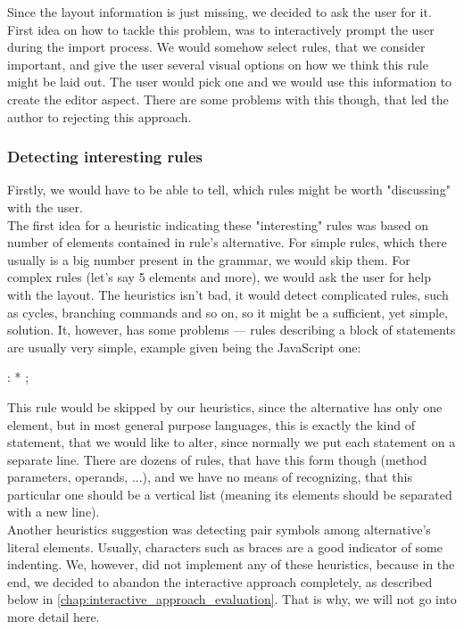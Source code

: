 Since the layout information is just missing, we decided to ask the user for it.
First idea on how to tackle this problem, was to interactively prompt the user during the import process.
We would somehow select rules, that we consider important, and give the user several visual options on how we think this rule might be laid out.
The user would pick one and we would use this information to create the editor aspect.
There are some problems with this though, that led the author to rejecting this approach.

\subsubsection{Detecting interesting rules}

Firstly, we would have to be able to tell, which rules might be worth "discussing" with the user.
\\

The first idea for a heuristic indicating these "interesting" rules was based on number of elements contained in rule's alternative.
For simple rules, which there usually is a big number present in the grammar, we would skip them.
For complex rules (let's say 5 elements and more), we would ask the user for help with the layout.
The heuristics isn't bad, it would detect complicated rules, such as cycles, branching commands and so on, so it might be a sufficient, yet simple, solution.
It, however, has some problems --- rules describing a block of statements are usually very simple, example given being the JavaScript one:

\begin{antlr}
	 : * ;
\end{antlr}

This rule would be skipped by our heuristics, since the alternative has only one element, but in most general purpose languages, this is exactly the kind of statement, that we would like to alter, since normally we put each statement on a separate line.
There are dozens of rules, that have this form though (method parameters, operands, ...), and we have no means of recognizing, that this particular one should be a vertical list (meaning its elements should be separated with a new line).
\\

Another heuristics suggestion was detecting pair symbols among alternative's literal elements.
Usually, characters such as braces are a good indicator of some indenting.
We, however, did not implement any of these heuristics, because in the end, we decided to abandon the interactive approach completely, as described below in \ref{chap:interactive_approach_evaluation}.
That is why, we will not go into more detail here.

